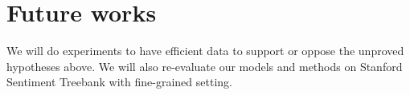\section{Future works}
We will do experiments to have efficient data to support or oppose the unproved hypotheses above.
We will also re-evaluate our models and methods on Stanford Sentiment Treebank with fine-grained setting.